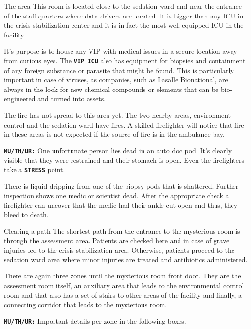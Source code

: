 \begin{rpg-commentbox}{The area}
    This room is located close to the sedation ward and near the entrance of the staff quarters where data drivers are located. It is bigger than any ICU in the crisis stabilization center and it is in fact the most well equipped ICU in the facility.

    It's purpose is to house any VIP with medical issues in a secure location away from curious eyes. The \texttt{\textbf{VIP ICU}} also has equipment for biopsies and containment of any foreign substance or parasite that might be found. 
    This is particularly important in case of viruses, as companies, such as Lasalle Bionational, are always in the look for new chemical compounds or elements that can be bio-engineered and turned into assets.

    The fire has not spread to this area yet. The two nearby areas, environment control and the sedation ward have fires. A skilled firefighter will notice that fire in these areas is not expected if the source of fire is in the ambulance bay.

    \texttt{\textbf{MU/TH/UR:}} One unfortunate person lies dead in an auto doc pod.
    It's clearly visible that they were restrained and their stomach is open. Even the firefighters take a \texttt{\textbf{STRESS}} point.

    There is liquid dripping from one of the biopsy pods that is shattered. Further inspection shows one medic or scientist dead. After the appropriate check a firefighter can uncover that the medic had their ankle cut open and thus, they bleed to death. 
\end{rpg-commentbox}   

\newsect


\begin{rpg-commentbox}{Clearing a path}
    The shortest path from the entrance to the mysterious room is through the assessment area. Patients are checked here and in case of grave injuries led to the crisis stabilization area. Otherwise, patients proceed to the sedation ward area where minor injuries are treated and antibiotics administered. 
    
    There are again three zones until the mysterious room front door. They are the assessment room itself, an auxiliary area that leads to the environmental control room and  that also has a set of stairs to other areas of the facility and finally, a connecting corridor that leads to the mysterious room.
    
    \texttt{\textbf{MU/TH/UR:}} Important details per zone in the following boxes.
\end{rpg-commentbox}      

